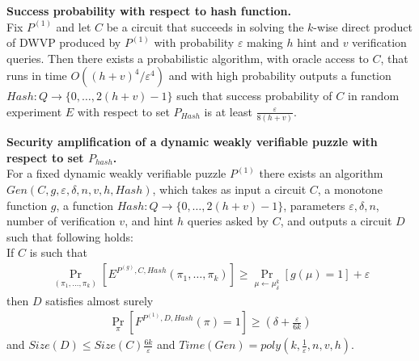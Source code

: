 %
%
\begin{lemma} \textbf{Success probability with respect to hash function.} \\
Fix $P^{(1)}$ and let $C$ be a circuit that succeeds in solving the $k$-wise direct product of DWVP produced by $P^{(1)}$
with probability $\varepsilon$ making $h$ hint and $v$ verification queries.
Then there exists a probabilistic algorithm, with oracle access to $C$, that runs in time $O((h+v)^4/\varepsilon^4)$
and with high probability outputs a function $Hash: Q \rightarrow \{0, \dots, 2(h+v)-1\}$ such that success probability of
$C$ in random experiment $E$ with respect to set $P_{Hash}$ is at least $\frac{\varepsilon}{8(h+v)}$.
\end{lemma}
%
%
\begin{lemma}\textbf{Security amplification of a dynamic weakly verifiable puzzle with respect to set $P_{hash}$.} \\
  For a fixed dynamic weakly verifiable puzzle $P^{(1)}$ there exists an algorithm\\
  $Gen(C, g, \varepsilon, \delta, n, v, h, Hash)$, which takes as input a circuit $C$, a monotone function $g$,
  a function $Hash : Q \rightarrow \{0, \dots, 2(h+v)-1\}$, parameters $\varepsilon, \delta, n$,
  number of verification $v$, and hint $h$ queries asked by $C$, and outputs a circuit $D$
  such that following holds: \\
  If $C$ is such that \\
  \begin{align*}
    \underset{(\pi_1, \dots, \pi_k)}{\Pr}[E^{P^{(g)}, C, Hash}(\pi_1, \dots, \pi_k)] \geq \underset{\mu \leftarrow \mu_\delta^k}{\Pr}[g(\mu) = 1] + \varepsilon
  \end{align*}
  then $D$ satisfies almost surely
  \begin{align*}
    \underset{\pi}{\Pr}[F^{P^{(1)},D, Hash}(\pi) = 1] \geq (\delta + \frac{\varepsilon}{6k})
  \end{align*}
  and $Size(D) \leq Size(C)\frac{6k}{\varepsilon}$ and $Time(Gen) = poly(k, \frac{1}{\varepsilon}, n, v, h)$.
\end{lemma}
%
%
